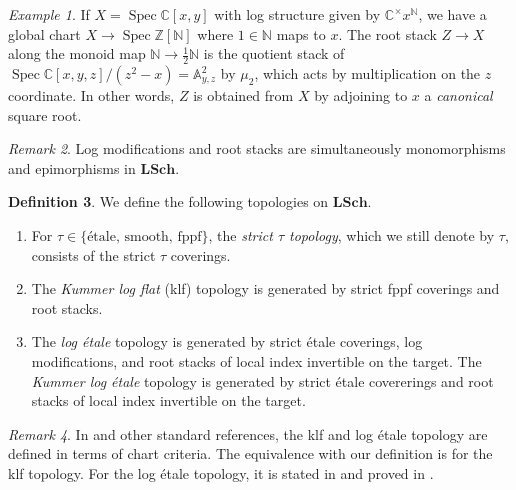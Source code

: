 \documentclass[a4paper,11pt]{amsart} %
\numberwithin{equation}{subsection}
\newcommand{\bb}[1]{{\mathbb{#1}}}
\newcommand{\bd}[1]{{\mathbf{#1}}}
\newcommand{\cat}[1]{\bd{#1}}
\newcommand{\Spec}{\operatorname{Spec}}
\theoremstyle{definition}
\newtheorem{definition}{Definition}[section]
\theoremstyle{plain}%
\theoremstyle{remark}
\newtheorem{remark}[definition]{Remark}
\newtheorem{example}[definition]{Example}
\begin{document}
\begin{example}
    If $X=\Spec \bb C[x,y]$ with log structure given by $\bb C^\times x^{\bb N}$, we have a global chart $X \to \Spec \bb Z[\bb N]$ where $1\in \bb N$ maps to $x$. The root stack $Z \to X$ along the monoid map $\bb N \to \frac{1}{2}\bb N$ is the quotient stack of $\Spec \bb C[x,y,z]/(z^2-x)=\bb A^2_{y,z}$ by $\mu_2$, which acts by multiplication on the $z$ coordinate. In other words, $Z$ is obtained from $X$ by adjoining to $x$ a \emph{canonical} square root.
\end{example}

\begin{remark}
    Log modifications and root stacks are simultaneously monomorphisms and epimorphisms in $\cat{LSch}$.
\end{remark}

\begin{definition}\label{definition:topologies_on_LSch}
    We define the following topologies on $\cat{LSch}$.
    \begin{enumerate}
        \item For $\tau\in\{\text{\'etale, smooth, fppf}\}$, the \emph{strict $\tau$ topology}, which we still denote by $\tau$, consists of the strict $\tau$ coverings.
        \item The \emph{Kummer log flat} (klf) topology is generated by strict fppf coverings and root stacks.
        \item The \emph{log \'etale} topology is generated by strict \'etale coverings, log modifications, and root stacks of local index invertible on the target. The \textit{Kummer log étale} topology is generated by strict étale covererings and root stacks of local index invertible on the target. 
    \end{enumerate}
\end{definition}

\begin{remark}
    In \cite{Kato} and other standard references, the klf and log \'etale topology are defined in terms of chart criteria. The equivalence with our definition is \cite[Corollary 3.6]{illusie2002overview} for the klf topology. For the log \'etale topology, it is stated in \cite[\S 9.1]{illusie2002overview} and proved in \cite[Proposition 3.9]{Nakayama}.
\end{remark}
\end{document}
